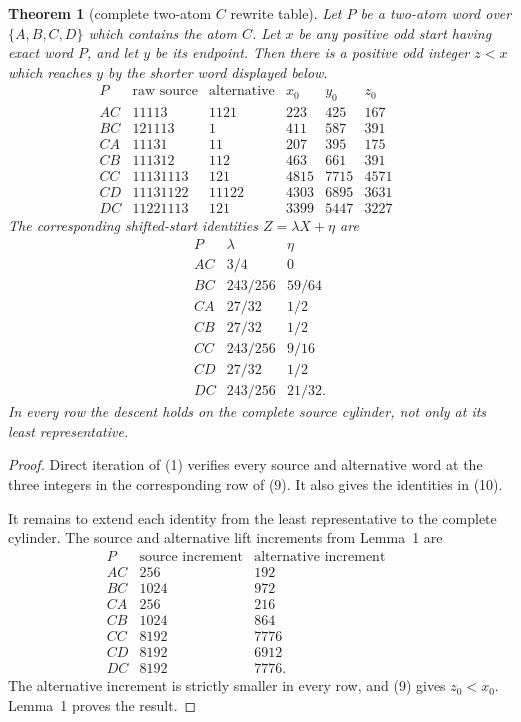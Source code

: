 \documentclass[11pt]{article}
\newtheorem{theorem}{Theorem}
\begin{document}
\begin{theorem}[complete two-atom $C$ rewrite table]
Let $P$ be a two-atom word over $\{A,B,C,D\}$ which contains the atom
$C$.  Let $x$ be any positive odd start having exact word $P$, and let
$y$ be its endpoint.  Then there is a positive odd integer $z<x$ which
reaches $y$ by the shorter word displayed below.
\[
\begin{array}{c|c|c|c|c|c}
P&\text{raw source}&\text{alternative}&x_0&y_0&z_0\\ \hline
AC&11113&1121&223&425&167\\
BC&121113&1&411&587&391\\
CA&11131&11&207&395&175\\
CB&111312&112&463&661&391\\
CC&11131113&121&4815&7715&4571\\
CD&11131122&11122&4303&6895&3631\\
DC&11221113&121&3399&5447&3227
\end{array}\qquad
\tag{9}
\]
The corresponding shifted-start identities $Z=\lambda X+\eta$ are
\[
\begin{array}{c|c|c}
P&\lambda&\eta\\ \hline
AC&3/4&0\\
BC&243/256&59/64\\
CA&27/32&1/2\\
CB&27/32&1/2\\
CC&243/256&9/16\\
CD&27/32&1/2\\
DC&243/256&21/32.
\end{array}
\tag{10}
\]
In every row the descent holds on the complete source cylinder, not only
at its least representative.
\end{theorem}

\begin{proof}
Direct iteration of (1) verifies every source and alternative word at
the three integers in the corresponding row of (9).  It also gives the
identities in (10).

It remains to extend each identity from the least representative to the
complete cylinder.  The source and alternative lift increments from
Lemma~1 are
\[
\begin{array}{c|r|r}
P&\text{source increment}&\text{alternative increment}\\ \hline
AC&256&192\\
BC&1024&972\\
CA&256&216\\
CB&1024&864\\
CC&8192&7776\\
CD&8192&6912\\
DC&8192&7776.
\end{array}\qquad
\tag{11}
\]
The alternative increment is strictly smaller in every row, and (9)
gives $z_0<x_0$.  Lemma~1 proves the result.
\end{proof}
\end{document}
